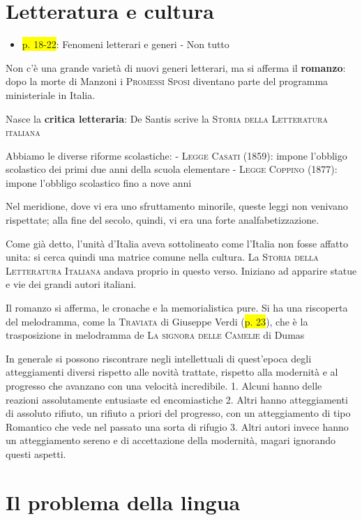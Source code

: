 \documentclass{book}
\newcommand{\pagine}[1]{\colorbox{yellow}{#1}}
\begin{document}
\section{Letteratura e cultura}

\begin{itemize}

\item
  \pagine{p. 18-22}: Fenomeni letterari e generi - Non tutto
\end{itemize}

Non c'è una grande varietà di nuovi generi letterari, ma si afferma il
\textbf{romanzo}: dopo la morte di Manzoni i \textsc{Promessi Sposi}
diventano parte del programma ministeriale in Italia.

Nasce la \textbf{critica letteraria}: De Santis scrive la \textsc{Storia
della Letteratura italiana}

Abbiamo le diverse riforme scolastiche: - \textsc{Legge Casati} (1859):
impone l'obbligo scolastico dei primi due anni della scuola elementare -
\textsc{Legge Coppino} (1877): impone l'obbligo scolastico fino a nove
anni

Nel meridione, dove vi era uno sfruttamento minorile, queste leggi non
venivano rispettate; alla fine del secolo, quindi, vi era una forte
analfabetizzazione.

Come già detto, l'unità d'Italia aveva sottolineato come l'Italia non
fosse affatto unita: si cerca quindi una matrice comune nella cultura.
La \textsc{Storia della Letteratura Italiana} andava proprio in questo
verso. Iniziano ad apparire statue e vie dei grandi autori italiani.

Il romanzo si afferma, le cronache e la memorialistica pure. Si ha una
riscoperta del melodramma, come la \textsc{Traviata} di Giuseppe Verdi
(\pagine{p. 23}), che è la trasposizione in melodramma de \textsc{La
signora delle Camelie} di Dumas

In generale si possono riscontrare negli intellettuali di quest'epoca
degli atteggiamenti diversi rispetto alle novità trattate, rispetto alla
modernità e al progresso che avanzano con una velocità incredibile. 1.
Alcuni hanno delle reazioni assolutamente entusiaste ed encomiastiche 2.
Altri hanno atteggiamenti di assoluto rifiuto, un rifiuto a priori del
progresso, con un atteggiamento di tipo Romantico che vede nel passato
una sorta di rifugio 3. Altri autori invece hanno un atteggiamento
sereno e di accettazione della modernità, magari ignorando questi
aspetti.

\section{Il problema della lingua}
\end{document}
